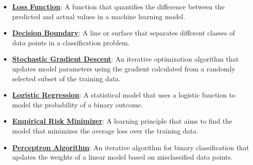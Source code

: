 \documentclass{article}%
\begin{document}
\begin{itemize}[leftmargin=*]
\item \href{https://purdue.brightspace.com/d2l/common/assets/pdfjs-d2l-dist/1.0.14-legacy/web/viewer.html?file=%2Fcontent%2Fenforced%2F1095467-wl.202510.CS.24300.001%2F05L2-ML Basics.pdf%3Fou%3D1095467&lang=en-us&container=d2l-fileviewer-rendered-pdf&fullscreen=d2l-fileviewer-rendered-pdf-dialog&height=667#page=25}{\textbf{Loss Function}}: A function that quantifies the difference between the predicted and actual values in a machine learning model.%
\item \href{https://purdue.brightspace.com/d2l/common/assets/pdfjs-d2l-dist/1.0.14-legacy/web/viewer.html?file=%2Fcontent%2Fenforced%2F1095467-wl.202510.CS.24300.001%2F05L2-ML Basics.pdf%3Fou%3D1095467&lang=en-us&container=d2l-fileviewer-rendered-pdf&fullscreen=d2l-fileviewer-rendered-pdf-dialog&height=667#page=24}{\textbf{Decision Boundary}}: A line or surface that separates different classes of data points in a classification problem.%
\item \href{https://purdue.brightspace.com/d2l/common/assets/pdfjs-d2l-dist/1.0.14-legacy/web/viewer.html?file=%2Fcontent%2Fenforced%2F1095467-wl.202510.CS.24300.001%2F05L2-ML Basics.pdf%3Fou%3D1095467&lang=en-us&container=d2l-fileviewer-rendered-pdf&fullscreen=d2l-fileviewer-rendered-pdf-dialog&height=667#page=29}{\textbf{Stochastic Gradient Descent}}: An iterative optimization algorithm that updates model parameters using the gradient calculated from a randomly selected subset of the training data.%
\item \href{https://purdue.brightspace.com/d2l/common/assets/pdfjs-d2l-dist/1.0.14-legacy/web/viewer.html?file=%2Fcontent%2Fenforced%2F1095467-wl.202510.CS.24300.001%2F05L2-ML Basics.pdf%3Fou%3D1095467&lang=en-us&container=d2l-fileviewer-rendered-pdf&fullscreen=d2l-fileviewer-rendered-pdf-dialog&height=667#page=31}{\textbf{Logistic Regression}}: A statistical model that uses a logistic function to model the probability of a binary outcome.%
\item \href{https://purdue.brightspace.com/d2l/common/assets/pdfjs-d2l-dist/1.0.14-legacy/web/viewer.html?file=%2Fcontent%2Fenforced%2F1095467-wl.202510.CS.24300.001%2F05L2-ML Basics.pdf%3Fou%3D1095467&lang=en-us&container=d2l-fileviewer-rendered-pdf&fullscreen=d2l-fileviewer-rendered-pdf-dialog&height=667#page=15}{\textbf{Empirical Risk Minimizer}}: A learning principle that aims to find the model that minimizes the average loss over the training data.%
\item \href{https://purdue.brightspace.com/d2l/common/assets/pdfjs-d2l-dist/1.0.14-legacy/web/viewer.html?file=%2Fcontent%2Fenforced%2F1095467-wl.202510.CS.24300.001%2F05L2-ML Basics.pdf%3Fou%3D1095467&lang=en-us&container=d2l-fileviewer-rendered-pdf&fullscreen=d2l-fileviewer-rendered-pdf-dialog&height=667#page=30}{\textbf{Perceptron Algorithm}}: An iterative algorithm for binary classification that updates the weights of a linear model based on misclassified data points.%
\end{itemize}
\end{document}
